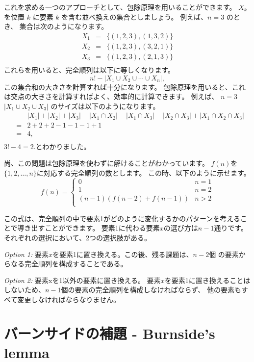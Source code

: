 これを求める一つのアプローチとして、包除原理を用いることができます。
$X_k$ を位置 $k$ に要素 $k$ を含む並べ換えの集合としましょう。
例えば、$n = 3$ のとき、 集合は次のようになります。
\[
\begin{array}{lcl}
X_1 & = & \{(1,2,3),(1,3,2)\} \\
X_2 & = & \{(1,2,3),(3,2,1)\} \\
X_3 & = & \{(1,2,3),(2,1,3)\} \\
\end{array}
\]
これらを用いると、完全順列は以下に等しくなります。
\[ n! - |X_1 \cup X_2 \cup \cdots \cup X_n|, \]
この集合和の大きさを計算すれば十分になります。
包除原理を用いると、これは交点の大きさを計算すればよく、効率的に計算できます。
例えば、 $n=3$
$|X_1 \cup X_2 \cup X_3|$ のサイズは以下のようになります。
\[
\begin{array}{lcl}
 & & |X_1| + |X_2| + |X_3| - |X_1 \cap X_2|  - |X_1 \cap X_3|  - |X_2 \cap X_3| + |X_1 \cap X_2 \cap X_3| \\
 & = & 2+2+2-1-1-1+1 \\
 & = & 4, \\
\end{array}
\]
$3!-4=2$.とわかりました。

尚、この問題は包除原理を使わずに解けることがわかっています。
$f(n)$を$\{1,2,\ldots,n\}$に対応する完全順列の数とします。
この時、以下のように示せます。
\begin{equation*}
    f(n) = \begin{cases}
               0               & n = 1\\
               1               & n = 2\\
               (n-1)(f(n-2) + f(n-1)) & n>2 \\
           \end{cases}
\end{equation*}


この式は、完全順列の中で要素1がどのように変化するかのパターンを考えることで導き出すことができます。
要素1に代わる要素$x$の選び方は$n - 1$通りです。
それぞれの選択において、2つの選択肢がある。

\textit{Option 1:} 要素$x$を要素1に置き換える。この後、残る課題は、$n - 2$個
の要素からなる完全順列を構成することである。

\textit{Option 2:} 要素xを1以外の要素に置き換える。 
要素$x$を要素1に置き換えることはしないため、$n - 1$個の要素の完全順列を構成しなければならず、
他の要素もすべて変更しなければならなりません。

\section{バーンサイドの補題 - Burnside's lemma}

